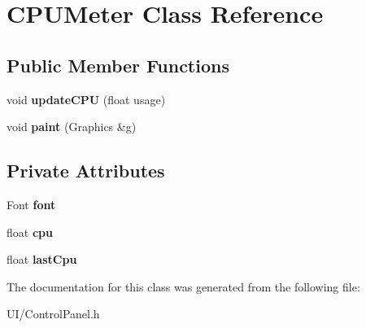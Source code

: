 \hypertarget{classCPUMeter}{\section{C\-P\-U\-Meter Class Reference}
\label{classCPUMeter}
}
\subsection*{Public Member Functions}
\begin{DoxyCompactItemize}
\item 
\hypertarget{classCPUMeter_acec74e9f60516cd756c0f4a6e8cc7c60}{void {\bfseries update\-C\-P\-U} (float usage)}\label{classCPUMeter_acec74e9f60516cd756c0f4a6e8cc7c60}

\item 
\hypertarget{classCPUMeter_a010aa0a79b6ad5056ea7805266f36403}{void {\bfseries paint} (Graphics \&g)}\label{classCPUMeter_a010aa0a79b6ad5056ea7805266f36403}

\end{DoxyCompactItemize}
\subsection*{Private Attributes}
\begin{DoxyCompactItemize}
\item 
\hypertarget{classCPUMeter_a0f6d8aec5c432c61c8f7a1fe255967da}{Font {\bfseries font}}\label{classCPUMeter_a0f6d8aec5c432c61c8f7a1fe255967da}

\item 
\hypertarget{classCPUMeter_a630638ac674c7dbd9d29e058f5005fb5}{float {\bfseries cpu}}\label{classCPUMeter_a630638ac674c7dbd9d29e058f5005fb5}

\item 
\hypertarget{classCPUMeter_a8112f3d9893336aa9dbdc61050304e81}{float {\bfseries last\-Cpu}}\label{classCPUMeter_a8112f3d9893336aa9dbdc61050304e81}

\end{DoxyCompactItemize}


The documentation for this class was generated from the following file\-:\begin{DoxyCompactItemize}
\item 
U\-I/Control\-Panel.\-h\end{DoxyCompactItemize}
